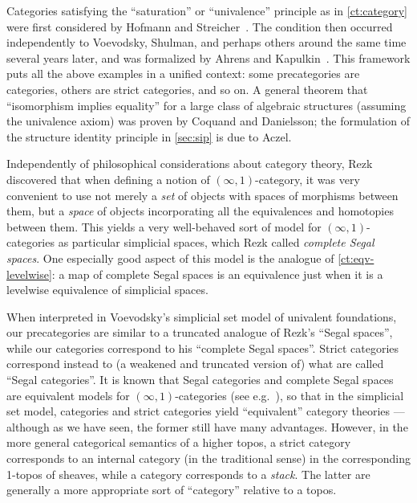 Categories satisfying the ``saturation'' or ``univalence'' principle as in \cref{ct:category} were first considered by Hofmann and Streicher~\cite{hs:gpd-typethy}.
The condition then occurred independently to Voevodsky, Shulman, and perhaps others around the same time several years later, and was formalized by Ahrens and Kapulkin~\cite{aks:rezk}.
This framework puts all the above examples in a unified context: some precategories are categories, others are strict categories, and so on.
A general theorem that ``isomorphism implies equality'' for a large class of algebraic structures (assuming the univalence axiom) was proven by Coquand and Danielsson; the formulation of the structure identity principle in \cref{sec:sip} is due to Aczel.

Independently of philosophical considerations about category theory, Rezk~\cite{rezk01css} discovered that when defining a notion of $(\infty,1)$-cat\-e\-go\-ry,
%
it was very convenient to use not merely a \emph{set} of objects with spaces of morphisms between them, but a \emph{space} of objects incorporating all the equivalences and homotopies between them.
This yields a very well-behaved sort of model for $(\infty,1)$-categories as particular simplicial spaces, which Rezk called \emph{complete Segal spaces}.
%
%
One especially good aspect of this model is the analogue of \cref{ct:eqv-levelwise}: a map of complete Segal spaces is an equivalence just when it is a levelwise equivalence of simplicial spaces.

When interpreted in Voevodsky's simplicial set model of univalent foundations, our precategories are similar to a truncated analogue of Rezk's ``Segal spaces'', while our categories correspond to his ``complete Segal spaces''.
%
Strict categories correspond instead to (a weakened and truncated version of) what are called ``Segal categories''.
It is known that Segal categories and complete Segal spaces are equivalent models for $(\infty,1)$-categories (see e.g.~\cite{bergner:infty-one}), so that in the simplicial set model, categories and strict categories yield ``equivalent'' category theories --- although as we have seen, the former still have many advantages.
However, in the more general categorical semantics of a higher topos,
%
a strict category corresponds to an internal category (in the traditional sense) in the corresponding 1-topos of sheaves, while a category corresponds to a \emph{stack}.
%
The latter are generally a more appropriate sort of ``category'' relative to a topos.

